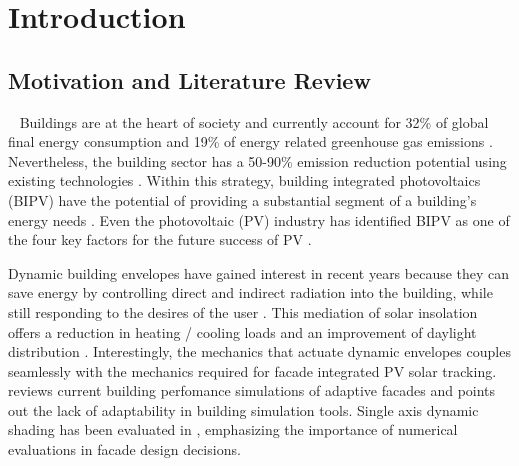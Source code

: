 \chapter{Introduction}


\section{Motivation and Literature Review}\
\label{ch:motivation}
	Buildings are at the heart of society and currently account for 32\% of global final energy consumption and 19\% of energy related greenhouse gas emissions \cite{IPCC}. Nevertheless, the building sector has a 50-90\% emission reduction potential using existing technologies \cite{IPCC}. Within this strategy, building integrated photovoltaics (BIPV) have the potential of providing a substantial segment of a building's energy needs \cite{defaix2012technical}. Even the photovoltaic (PV) industry has identified BIPV as one of the four key factors for the future success of PV \cite{raugei2009life}. 



	Dynamic building envelopes have gained interest in recent years because they can save energy by controlling direct and indirect radiation into the building, while still responding to the desires of the user \cite{loonen2013climate}. This mediation of solar insolation offers a reduction in heating / cooling loads and an improvement of daylight distribution \cite{rossi2012adaptive}. Interestingly, the mechanics that actuate dynamic envelopes couples seamlessly with the mechanics required for facade integrated PV solar tracking. \cite{loonen16} reviews current building perfomance simulations of adaptive facades and points out the lack of adaptability in building simulation tools. Single axis dynamic shading has been evaluated in \cite{nielsen2011quantifying}, emphasizing the importance of numerical evaluations in facade design decisions. 

